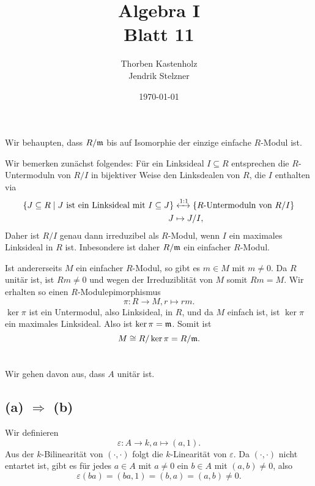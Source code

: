 \documentclass[a4paper,10pt]{article}
\title{\sc Algebra I \\ \Large Blatt 11}
\author{Thorben Kastenholz \\ Jendrik Stelzner}
\date{\today}
\begin{document}
\maketitle





\addtocounter{section}{2}





\section{}
Wir behaupten, dass $R/\mathfrak{m}$ bis auf Isomorphie der einzige einfache $R$-Modul ist.

Wir bemerken zunächst folgendes: Für ein Linksideal $I \subseteq R$ entsprechen die $R$-Untermoduln von $R/I$ in bijektiver Weise den Linksdealen von $R$, die $I$ enthalten via
\begin{align*}
 \{J \subseteq R \mid J \text{ ist ein Linksideal mit } I \subseteq J\} &\xleftrightarrow{1:1}\{\text{$R$-Untermoduln von $R/I$}\} \\
 J &\mapsto J/I,
\end{align*}
Daher ist $R/I$ genau dann irreduzibel als $R$-Modul, wenn $I$ ein maximales Linksideal in $R$ ist. Inbesondere ist daher $R/\mathfrak{m}$ ein einfacher $R$-Modul.

Ist andererseits $M$ ein einfacher $R$-Modul, so gibt es $m \in M$ mit $m \neq 0$. Da $R$ unitär ist, ist $Rm \neq 0$ und wegen der Irreduziblität von $M$ somit $Rm = M$. Wir erhalten so einen $R$-Modulepimorphismus
\[
 \pi : R \to M, r \mapsto rm.
\]
$\ker \pi$ ist ein Untermodul, also Linksideal, in $R$, und da $M$ einfach ist, ist $\ker \pi$ ein maximales Linksideal. Also ist $\ker \pi = \mathfrak{m}$. Somit ist
\[
 M \cong R/\ker \pi = R/\mathfrak{m}.
\]





\section{}
Wir gehen davon aus, dass $A$ unitär ist.


\subsection*{(a) $\Rightarrow$ (b)}
Wir definieren
\[
 \varepsilon : A \to k, a \mapsto (a,1).
\]
Aus der $k$-Bilinearität von $(\cdot,\cdot)$ folgt die $k$-Linearität von $\varepsilon$. Da $(\cdot,\cdot)$ nicht entartet ist, gibt es für jedes $a \in A$ mit $a \neq 0$ ein $b \in A$ mit $(a,b) \neq 0$, also
\[
 \varepsilon(ba) = (ba,1) = (b,a) = (a,b) \neq 0.
\]
\end{document}
